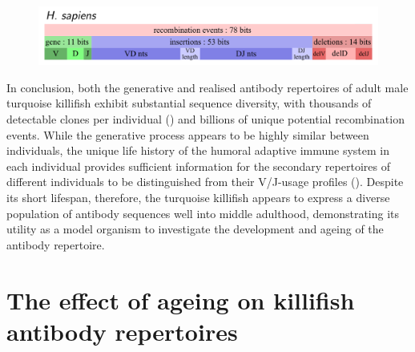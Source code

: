 \begin{figure}
\centering
\includegraphics[width = \textwidth]{_Figures/png_edited/human-repertoire-entropy.png}
\label{fig:igseq-pilot-human-entropies}
\end{figure}

In conclusion, both the generative and realised antibody repertoires of adult male turquoise killifish exhibit substantial sequence diversity, with thousands of detectable clones per individual () and billions of unique potential recombination events. While the generative process appears to be highly similar between individuals, the unique life history of the humoral adaptive immune system in each individual provides sufficient information for the secondary repertoires of different individuals to be distinguished from their V/J-usage profiles (). Despite its short lifespan, therefore, the turquoise killifish appears to express a diverse population of antibody sequences well into middle adulthood, demonstrating its utility as a model organism to investigate the development and ageing of the antibody repertoire.

\FloatBarrier
\clearpage

\section{The effect of ageing on killifish antibody repertoires}
\label{sec:igseq_ageing}

